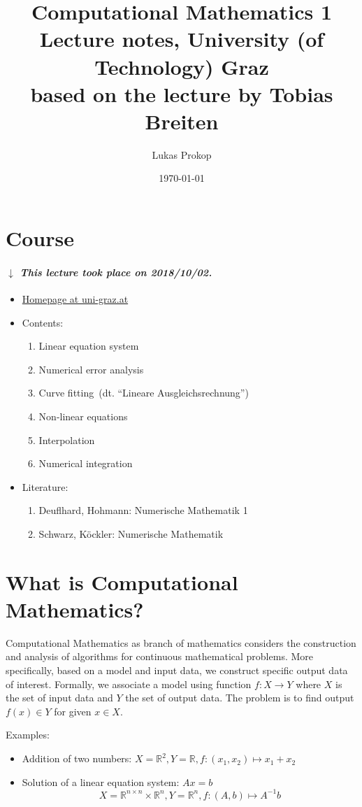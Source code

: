 \documentclass[a4paper]{article}
\title{
  Computational Mathematics 1 \\
  \large{Lecture notes, University (of Technology) Graz} \\
  based on the lecture by Tobias Breiten
}
\date{\today}
\author{Lukas Prokop}
\numberwithin{lecref}{section}
\theoremstyle{break}
\newcommand{\dateref}[1]{%
  \begin{mdframed}[backgroundcolor=gray!10,innerbottommargin=0pt,innertopmargin=0pt]
    \paragraph{\textit{$\downarrow$ This lecture took place on #1.}}%
  \end{mdframed}%
}
\newcommand{\dt}[1]{(dt. \enquote{\foreignlanguage{german}{#1}})}
\begin{document}
\maketitle
\tableofcontents

\section*{Course}

\dateref{2018/10/02}

\begin{itemize}
  \item \href{https://imsc.uni-graz.at/breiten/teaching/numa18/}{Homepage at uni-graz.at}
  \item Contents:
    \begin{enumerate}
      \item Linear equation system
      \item Numerical error analysis
      \item Curve fitting~\dt{Lineare Ausgleichsrechnung}
      \item Non-linear equations
      \item Interpolation
      \item Numerical integration
    \end{enumerate}
  \item Literature:
    \begin{enumerate}
      \item Deuflhard, Hohmann: Numerische Mathematik 1
      \item Schwarz, Köckler: Numerische Mathematik
    \end{enumerate}
\end{itemize}

\clearpage
\section{What is Computational Mathematics?}
%
Computational Mathematics as branch of mathematics considers the construction and analysis of algorithms for continuous mathematical problems.
More specifically, based on a model and input data, we construct specific output data of interest.
Formally, we associate a model using function $f: X \to Y$ where $X$ is the set of input data and $Y$ the set of output data. The problem is to find output $f(x) \in Y$ for given $x \in X$.

Examples:
\begin{itemize}
  \item Addition of two numbers: $X = \mathbb R^2, Y = \mathbb R, f: (x_1, x_2) \mapsto x_1 + x_2$
  \item Solution of a linear equation system: $Ax = b$
    \[ X = \mathbb R^{n \times n} \times \mathbb R^n, Y = \mathbb R^n, f: (A, b) \mapsto A^{-1} b \]
\end{itemize}
\end{document}
